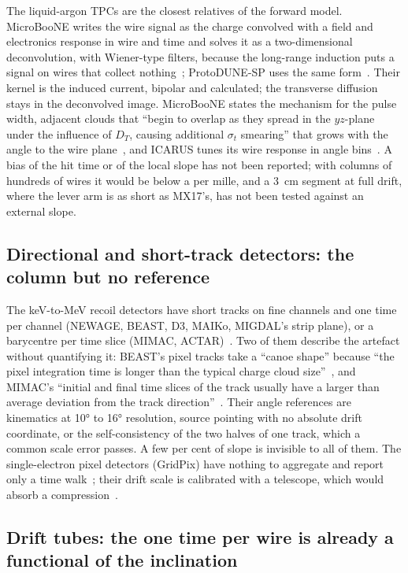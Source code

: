 The liquid-argon TPCs are the closest relatives of the forward model. MicroBooNE writes the wire signal as the charge
convolved with a field and electronics response in wire and time and solves it as a two-dimensional deconvolution, with
Wiener-type filters, because the long-range induction puts a signal on wires that collect nothing~\cite{Adams2018a,Adams2018b};
ProtoDUNE-SP uses the same form~\cite{ProtoDUNE2020}. Their kernel is the induced current, bipolar and calculated; the transverse
diffusion stays in the deconvolved image. MicroBooNE states the mechanism for the pulse width, adjacent clouds that ``begin to
overlap as they spread in the $yz$-plane under the influence of $D_T$, causing additional $\sigma_t$ smearing'' that grows with the
angle to the wire plane~\cite{MicroBooNE2021}, and ICARUS tunes its wire response in angle bins~\cite{ICARUS2024}. A bias of the
hit time or of the local slope has not been reported; with columns of hundreds of wires it would be below a per mille, and a
3~cm segment at full drift, where the lever arm is as short as MX17's, has not been tested against an external slope.

\subsection{Directional and short-track detectors: the column but no reference}

The keV-to-MeV recoil detectors have short tracks on fine channels and one time per channel (NEWAGE, BEAST, D3, MAIKo,
MIGDAL's strip plane), or a barycentre per time slice (MIMAC, ACTAR)~\cite{MIMAC2020,BEAST2019,MAIKo2018,MIGDAL2023}. Two of them
describe the artefact without quantifying it: BEAST's pixel tracks take a ``canoe shape'' because ``the pixel integration time
is longer than the typical charge cloud size''~\cite{BEAST2019}, and MIMAC's ``initial and final time slices of the track
usually have a larger than average deviation from the track direction''~\cite{MIMAC2020}. Their angle references are
kinematics at \ang{10} to \ang{16} resolution, source pointing with no absolute drift coordinate, or the self-consistency of the two
halves of one track, which a common scale error passes. A few per cent of slope is invisible to all of them. The single-electron
pixel detectors (GridPix) have nothing to aggregate and report only a time walk~\cite{GridPix2018}; their drift scale is
calibrated with a telescope, which would absorb a compression~\cite{GasPix2019}.

\subsection{Drift tubes: the one time per wire is already a functional of the inclination}


